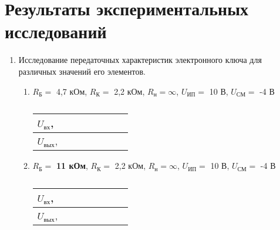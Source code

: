 \section{Результаты экспериментальных исследований}

\begin{enumerate}

\item{Исследование передаточных характеристик электронного ключа для различных значений его элементов.}

\begin{enumerate}

\item 
$ R_{\text{Б}} = $ 4,7 кОм, $ R_{\text{К}} = $ 2,2 кОм, $ R_{\text{н}} = \infty $, $ U_{\text{ИП}} = $ 10 В, $ U_{\text{СМ}} = $ -4 В  

\begin{table} [h!]
  \caption{}
  \begin{tabular}{| m{2cm} | m{1.5cm} | m{1.5cm} | m{1.5cm} | m{1.5cm} | m{1.5cm} | m{1.5cm} | m{1.5cm} |}
    \hline
    \centering $ U_{\text{вх}} $, \hspace{1cm}  & & & & & & & \\
    \hline
    \centering $ U_{\text{вых}} $, \hspace{1cm} & & & & & & & \\
    \hline
  \end{tabular}
\end{table}

\item 
$ R_{\text{Б}} = $ \textbf{11 кОм}, $ R_{\text{К}} = $ 2,2 кОм, $ R_{\text{н}} = \infty $, $ U_{\text{ИП}} = $ 10 В, $ U_{\text{СМ}} = $ -4 В  

\begin{table} [h!]
  \caption{}
  \begin{tabular}{| m{2cm} | m{1.5cm} | m{1.5cm} | m{1.5cm} | m{1.5cm} | m{1.5cm} | m{1.5cm} | m{1.5cm} |}
    \hline
    \centering $ U_{\text{вх}} $, \hspace{1cm}  & & & & & & & \\
    \hline
    \centering $ U_{\text{вых}} $, \hspace{1cm} & & & & & & & \\
    \hline
  \end{tabular}
\end{table}

\newpage


\end{enumerate}
\end{enumerate}
